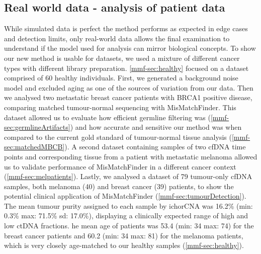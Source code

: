 



\subsection{Real world data - analysis of patient data}
\label{mmf-sec:realworld}

While simulated data is perfect  the method performs as expected in edge cases and  detection limits, only real-world data allows the final examination to understand if the model used for analysis can mirror biological concepts. To show  our new method is usable for  datasets, we used a mixture of different cancer types with different library preparation. \autoref{mmf-sec:healthy} focused on  a dataset comprised of 60  healthy individuals. First, we generated a background noise model and excluded aging as one of the sources of variation from our data. Then we analysed two metastatic breast cancer patients with BRCA1 positive disease, comparing matched tumour-normal sequencing with MisMatchFinder. This dataset allowed us to evaluate how efficient germline filtering was (\autoref{mmf-sec:germlineArtifacts}) and how accurate and sensitive our method was when compared to the current gold standard of tumour-normal tissue analysis (\autoref{mmf-sec:matchedMBCB}).
A second dataset containing samples of two cfDNA time points and corresponding tissue from a patient with metastatic melanoma allowed us to validate  performance of MisMatchFinder in a different cancer context (\autoref{mmf-sec:melpatients}). Lastly, we analysed a dataset of 79 tumour-only cfDNA samples, both melanoma (40) and breast cancer (39) patients, to show the potential clinical application of MisMatchFinder (\autoref{mmf-sec:tumourDetection}). The mean tumour purity assigned to each sample by ichorCNA was 16.2\% (min: 0.3\% max: 71.5\% sd: 17.0\%), displaying a clinically expected range of high and low ctDNA fractions. he mean age of patients was 53.4 (min: 34 max: 74) for the breast cancer patients and 60.2 (min: 34 max: 81) for the melanoma patients, which is very closely age-matched to our healthy samples (\autoref{mmf-sec:healthy}).

